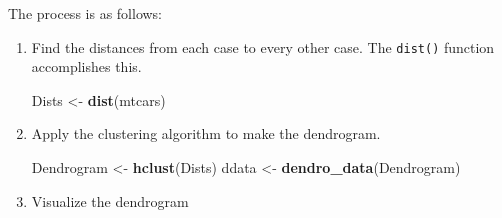 \documentclass[]{tufte-handout}
\newenvironment{Shaded}{}{}
\newcommand{\KeywordTok}[1]{\textcolor[rgb]{0.00,0.44,0.13}{\textbf{{#1}}}}
\newcommand{\DataTypeTok}[1]{\textcolor[rgb]{0.56,0.13,0.00}{{#1}}}
\newcommand{\DecValTok}[1]{\textcolor[rgb]{0.25,0.63,0.44}{{#1}}}
\newcommand{\StringTok}[1]{\textcolor[rgb]{0.25,0.44,0.63}{{#1}}}
\newcommand{\OtherTok}[1]{\textcolor[rgb]{0.00,0.44,0.13}{{#1}}}
\newcommand{\NormalTok}[1]{{#1}}
\begin{document}

The process is as follows:

\enlargethispage{1.5in}

\begin{enumerate}
\def\labelenumi{\arabic{enumi}.}
\item
  Find the distances from each case to every other case. The
  \texttt{dist()} function accomplishes this.

\begin{Shaded}
\begin{Highlighting}[]
\NormalTok{Dists <-}\StringTok{ }\KeywordTok{dist}\NormalTok{(mtcars)}
\end{Highlighting}
\end{Shaded}

  \vspace*{-.2in}
\item
  Apply the clustering algorithm to make the dendrogram.

\begin{Shaded}
\begin{Highlighting}[]
\NormalTok{Dendrogram <-}\StringTok{ }\KeywordTok{hclust}\NormalTok{(Dists)}
\NormalTok{ddata <-}\StringTok{ }\KeywordTok{dendro_data}\NormalTok{(Dendrogram)}
\end{Highlighting}
\end{Shaded}

  \vspace*{-.2in}
\item
  Visualize the dendrogram

\begin{Shaded}
\end{Shaded}
\end{enumerate}
\end{document}

